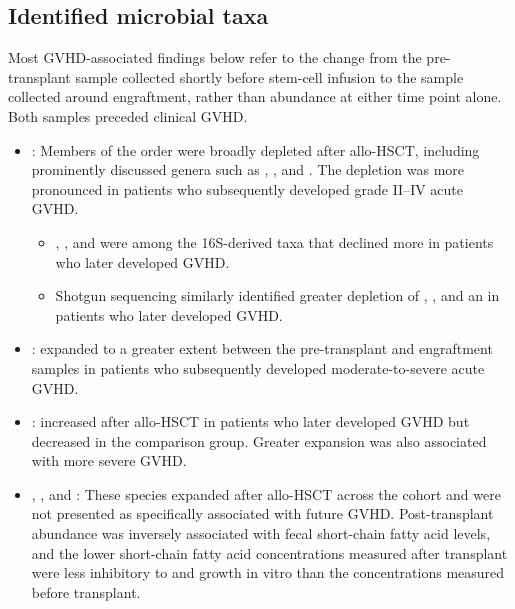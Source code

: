 \subsection{Identified microbial taxa}
Most GVHD-associated findings below refer to the change from the pre-transplant sample collected shortly before stem-cell infusion to the sample collected around engraftment, rather than abundance at either time point alone. Both samples preceded clinical GVHD.

\begin{itemize}

\item \taxClostridiales: Members of the \taxClostridiales order were broadly depleted after allo-HSCT, including prominently discussed genera such as \taxBlautia, \taxFaecalibacterium, and \taxOscillibacter. The depletion was more pronounced in patients who subsequently developed grade II--IV acute GVHD.
  \begin{itemize}
  \item \taxRuminococcaceae, \taxClostridiumIV, and \taxFlavonifractor were among the 16S-derived taxa that declined more in patients who later developed GVHD.
  \item Shotgun sequencing similarly identified greater depletion of \taxAnaeromassilibacillusSp, \taxButyricicoccusSp, and an \taxLachnoanaerobaculumSpecies in patients who later developed GVHD.
  \end{itemize}

\item \taxEnterococcusFaecium: \taxEfaecium expanded to a greater extent between the pre-transplant and engraftment samples in patients who subsequently developed moderate-to-severe acute GVHD.

\item \taxParabacteroides: \taxParabacteroides increased after allo-HSCT in patients who later developed GVHD but decreased in the comparison group. Greater expansion was also associated with more severe GVHD.

\item \taxStaphylococcusAureus, \taxStaphylococcusEpidermidis, and \taxStaphylococcusSimulans: These species expanded after allo-HSCT across the cohort and were not presented as specifically associated with future GVHD. Post-transplant \taxStaphylococcus abundance was inversely associated with fecal short-chain fatty acid levels, and the lower short-chain fatty acid concentrations measured after transplant were less inhibitory to \taxSaureus and \taxSepidermidis growth in vitro than the concentrations measured before transplant.


\end{itemize}
